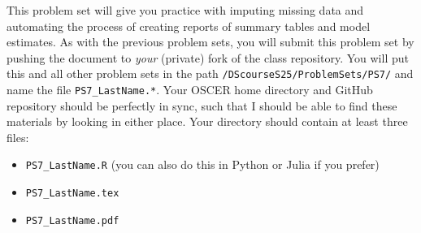\documentclass[12pt,english]{exam}
\begin{document}
This problem set will give you practice with imputing missing data and automating the process of creating reports of summary tables and model estimates.
As with the previous problem sets, you will submit this problem set by pushing the document to \emph{your} (private) fork of the class repository. You will put this and all other problem sets in the path \texttt{/DScourseS25/ProblemSets/PS7/} and name the file \texttt{PS7\_LastName.*}. Your OSCER home directory and GitHub repository should be perfectly in sync, such that I should be able to find these materials by looking in either place. Your directory should contain at least three files:
\begin{itemize}
    \item \texttt{PS7\_LastName.R} (you can also do this in Python or Julia if you prefer)
    \item \texttt{PS7\_LastName.tex}
    \item \texttt{PS7\_LastName.pdf}
\end{itemize}
\end{document}
